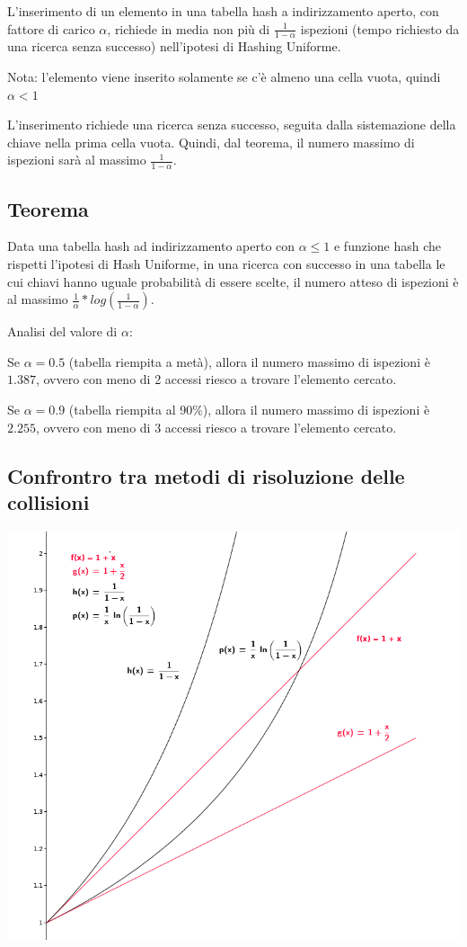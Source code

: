 \documentclass[tikz]{article}
\begin{document}
{L'inserimento di un elemento in una tabella hash a indirizzamento aperto, con fattore di carico $\alpha$, richiede in media non più di $\frac{1}{1-\alpha}$ ispezioni (tempo richiesto da una ricerca senza successo) nell'ipotesi di Hashing Uniforme.}

{Nota: l'elemento viene inserito solamente se c'è almeno una cella vuota, quindi $\alpha < 1$}

{L'inserimento richiede una ricerca senza successo, seguita dalla sistemazione della chiave nella prima cella vuota. Quindi, dal teorema, il numero massimo di ispezioni sarà al massimo $\frac{1}{1-\alpha}$.}

\subsection{Teorema}

{Data una tabella hash ad indirizzamento aperto con $\alpha \leq 1$ e funzione hash che rispetti l'ipotesi di Hash Uniforme, in una ricerca con successo in una tabella le cui chiavi hanno uguale probabilità di essere scelte, il numero atteso di ispezioni è al massimo $\frac{1}{\alpha} * log(\frac{1}{1-\alpha})$.}

{Analisi del valore di $\alpha$:}

{Se $\alpha=0.5$ (tabella riempita a metà), allora il numero massimo di ispezioni è $1.387$, ovvero con meno di 2 accessi riesco a trovare l'elemento cercato.}

{Se $\alpha=0.9$ (tabella riempita al 90\%), allora il numero massimo di ispezioni è $2.255$, ovvero con meno di 3 accessi riesco a trovare l'elemento cercato.}

\subsection{Confrontro tra metodi di risoluzione delle collisioni}

{\includegraphics{images/image541.png}}
\end{document}
